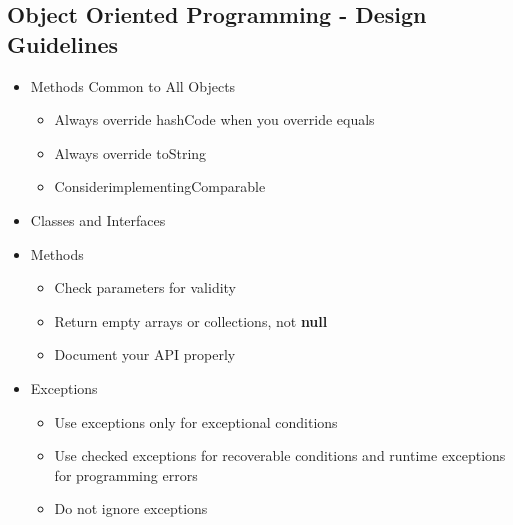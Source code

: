 \subsection*{Object Oriented Programming - Design Guidelines}
\begin{itemize}
	\item Methods Common to All Objects
	\begin{itemize}
		\item Always override hashCode when you override equals
		\item Always override toString
		\item ConsiderimplementingComparable
	\end{itemize}

	\item Classes and Interfaces
		\vspace{9pt}


	\item Methods
	\begin{itemize}
		\item Check parameters for validity
		\item Return empty arrays or collections, not \textbf{null}
		\item Document your API properly
	\end{itemize}

	\item Exceptions
	\begin{itemize}
		\item Use exceptions only for exceptional conditions
		\item Use checked exceptions for recoverable conditions and runtime exceptions for programming errors
		\item Do not ignore exceptions
	\end{itemize}


\end{itemize}

